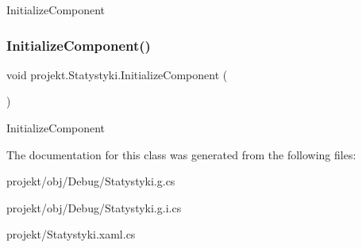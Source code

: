 Initialize\+Component 

\mbox{\label{classprojekt_1_1_statystyki_a6f4801d8176e1c715f5260bf055b0915}} 
\subsubsection{\texorpdfstring{Initialize\+Component()}{InitializeComponent()}\hspace{0.1cm}{\footnotesize\ttfamily [9/9]}}
{\footnotesize\ttfamily void projekt.\+Statystyki.\+Initialize\+Component (\begin{DoxyParamCaption}{ }\end{DoxyParamCaption})\hspace{0.3cm}{\ttfamily [inline]}}



Initialize\+Component 



The documentation for this class was generated from the following files\+:\begin{DoxyCompactItemize}
\item 
projekt/obj/\+Debug/Statystyki.\+g.\+cs\item 
projekt/obj/\+Debug/Statystyki.\+g.\+i.\+cs\item 
projekt/Statystyki.\+xaml.\+cs\end{DoxyCompactItemize}
